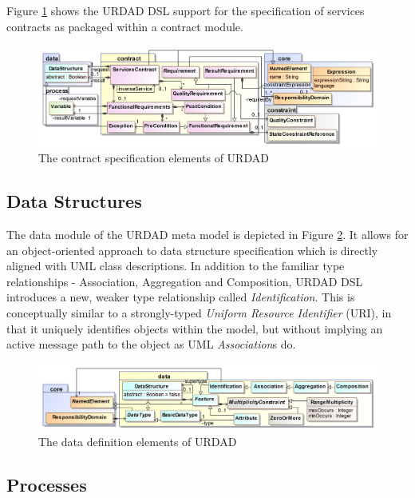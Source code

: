 Figure \ref{fig:contractModule} shows the URDAD DSL support for the specification of services contracts as packaged within a contract module.

\begin{figure}[Htbp]
  \centering
  \includegraphics{contract}
  \caption{The contract specification elements of URDAD}
  \label{fig:contractModule}
\end{figure}


\subsection{Data Structures}

The data module of the URDAD meta model is depicted in Figure \ref{fig:dataStructureModule}. It allows for an object-oriented approach to data structure specification which is directly aligned with UML class descriptions. In addition to the familiar type relationships - Association, Aggregation and Composition, URDAD DSL introduces a new, weaker type relationship called \emph{Identification}. This is conceptually similar to a strongly-typed \emph{Uniform Resource Identifier} (URI), in that it uniquely identifies objects within the model, but without implying an active message path to the object as UML \emph{Association}s do.
 
\begin{figure}[Htbp]
  \centering
  \includegraphics{data}
  \caption{The data definition elements of URDAD}
  \label{fig:dataStructureModule}
\end{figure}

\subsection{Processes}

